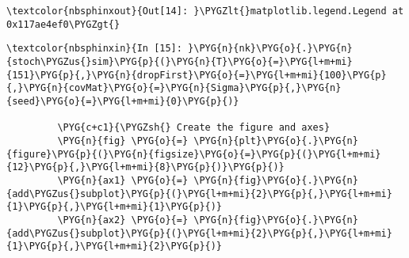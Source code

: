 \documentclass[letterpaper,10pt,openany,oneside,english]{sphinxmanual}
\begin{document}
\begin{Verbatim}[commandchars=\\\{\}]
\end{Verbatim}

\begin{Verbatim}[commandchars=\\\{\}]
\textcolor{nbsphinxout}{Out[14]: }\PYGZlt{}matplotlib.legend.Legend at 0x117ae4ef0\PYGZgt{}
\end{Verbatim}

\noindent{}

\begin{Verbatim}[commandchars=\\\{\}]
\textcolor{nbsphinxin}{In [15]: }\PYG{n}{nk}\PYG{o}{.}\PYG{n}{stoch\PYGZus{}sim}\PYG{p}{(}\PYG{n}{T}\PYG{o}{=}\PYG{l+m+mi}{151}\PYG{p}{,}\PYG{n}{dropFirst}\PYG{o}{=}\PYG{l+m+mi}{100}\PYG{p}{,}\PYG{n}{covMat}\PYG{o}{=}\PYG{n}{Sigma}\PYG{p}{,}\PYG{n}{seed}\PYG{o}{=}\PYG{l+m+mi}{0}\PYG{p}{)}
         
         \PYG{c+c1}{\PYGZsh{} Create the figure and axes}
         \PYG{n}{fig} \PYG{o}{=} \PYG{n}{plt}\PYG{o}{.}\PYG{n}{figure}\PYG{p}{(}\PYG{n}{figsize}\PYG{o}{=}\PYG{p}{(}\PYG{l+m+mi}{12}\PYG{p}{,}\PYG{l+m+mi}{8}\PYG{p}{)}\PYG{p}{)}
         \PYG{n}{ax1} \PYG{o}{=} \PYG{n}{fig}\PYG{o}{.}\PYG{n}{add\PYGZus{}subplot}\PYG{p}{(}\PYG{l+m+mi}{2}\PYG{p}{,}\PYG{l+m+mi}{1}\PYG{p}{,}\PYG{l+m+mi}{1}\PYG{p}{)}
         \PYG{n}{ax2} \PYG{o}{=} \PYG{n}{fig}\PYG{o}{.}\PYG{n}{add\PYGZus{}subplot}\PYG{p}{(}\PYG{l+m+mi}{2}\PYG{p}{,}\PYG{l+m+mi}{1}\PYG{p}{,}\PYG{l+m+mi}{2}\PYG{p}{)}
         

\end{Verbatim}
\end{document}
